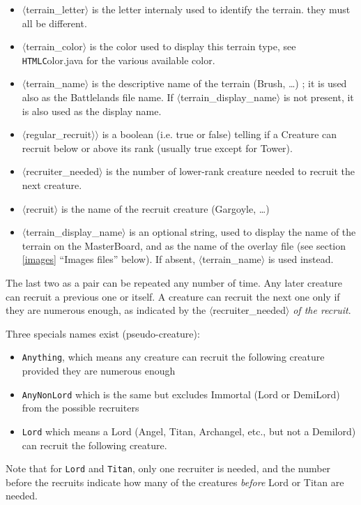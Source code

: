 \documentclass{article}
\begin{document}
\begin{itemize}
\item $\langle$terrain\_letter$\rangle$ is the letter internaly used to identify the terrain. they must all be different.
\item $\langle$terrain\_color$\rangle$ is the color used to display this terrain type, see \texttt{HTMLC}olor.java for the various available color.
\item $\langle$terrain\_name$\rangle$ is the descriptive name of the terrain (Brush, \ldots) ; it is used also as the Battlelands file name. If $\langle$terrain\_display\_name$\rangle$ is not present, it is also used as the display name.
\item $\langle$regular\_recruit$\rangle$$\rangle$ is a boolean (i.e. true or false) telling if a Creature can recruit below or above its rank (usually true except for Tower).
\item $\langle$recruiter\_needed$\rangle$ is the number of lower-rank creature needed to recruit the next creature.
\item $\langle$recruit$\rangle$ is the name of the recruit creature (Gargoyle, \ldots)
\item $\langle$terrain\_display\_name$\rangle$ is an optional string, used to display the name of the terrain on the MasterBoard, and as the name of the overlay file (see section \ref{images} ``Images files'' below). If absent, $\langle$terrain\_name$\rangle$ is used instead.
\end{itemize}

The last two as a pair can be repeated any number of time. Any later creature can recruit a previous one or itself. A creature can recruit the next one only if they are numerous enough, as indicated by the $\langle$recruiter\_needed$\rangle$ \emph{of the recruit}.

Three specials names exist (pseudo-creature):
\begin{itemize}
\item \texttt{Anything}, which means any creature can recruit the following creature provided they are numerous enough
\item \texttt{AnyNonLord} which is the same but excludes Immortal (Lord or DemiLord) from the possible recruiters
\item \texttt{Lord} which means a Lord (Angel, Titan, Archangel, etc., but not a Demilord) can recruit the following creature.
\end{itemize}

Note that for \texttt{Lord} and \texttt{Titan}, only one recruiter is needed, and the number before the recruits indicate how many of the creatures \emph{before} Lord or Titan are needed.
\end{document}
